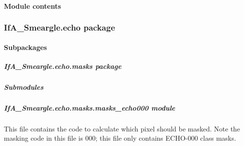 \documentclass[letterpaper,10pt,english]{sphinxmanual}
\begin{document}
\paragraph{Module contents}
\label{\detokenize{python_docstrings/IfA_Smeargle.bravo:module-IfA_Smeargle.bravo}}\label{\detokenize{python_docstrings/IfA_Smeargle.bravo:module-contents}}

\subsubsection{IfA\_Smeargle.echo package}
\label{\detokenize{python_docstrings/IfA_Smeargle.echo:ifa-smeargle-echo-package}}\label{\detokenize{python_docstrings/IfA_Smeargle.echo::doc}}

\paragraph{Subpackages}
\label{\detokenize{python_docstrings/IfA_Smeargle.echo:subpackages}}

\subparagraph{IfA\_Smeargle.echo.masks package}
\label{\detokenize{python_docstrings/IfA_Smeargle.echo.masks:ifa-smeargle-echo-masks-package}}\label{\detokenize{python_docstrings/IfA_Smeargle.echo.masks::doc}}

\subparagraph{Submodules}
\label{\detokenize{python_docstrings/IfA_Smeargle.echo.masks:submodules}}

\subparagraph{IfA\_Smeargle.echo.masks.masks\_echo000 module}
\label{\detokenize{python_docstrings/IfA_Smeargle.echo.masks.masks_echo000:module-IfA_Smeargle.echo.masks.masks_echo000}}\label{\detokenize{python_docstrings/IfA_Smeargle.echo.masks.masks_echo000:ifa-smeargle-echo-masks-masks-echo000-module}}\label{\detokenize{python_docstrings/IfA_Smeargle.echo.masks.masks_echo000::doc}}
This file contains the code to calculate which pixel should be masked. Note the masking code
in this file is 000; this file only contains ECHO-000 class masks.
\end{document}
